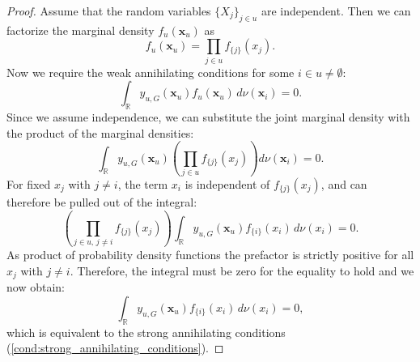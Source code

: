\begin{proof}
Assume that the random variables $\{X_j\}_{j \in u}$ are independent. Then we can factorize the marginal density $f_u(\boldsymbol{x}_u)$ as
\[
f_u(\boldsymbol{x}_u) = \prod_{j \in u} f_{\{j\}}(x_j).
\]
Now we require the weak annihilating conditions for some $i \in u \neq \emptyset$:
\[
\int_{\mathbb{R}} y_{u,G}(\boldsymbol{x}_u) f_u(\boldsymbol{x}_u) \, d \nu(\boldsymbol{x}_i) = 0.
\]
Since we assume independence, we can substitute the joint marginal density with the product of the marginal densities:
\[
\int_{\mathbb{R}} y_{u,G}(\boldsymbol{x}_u) \left( \prod_{j \in u} f_{{\{j\}}}(x_j) \right) d \nu(\boldsymbol{x}_i) = 0.
\]
For fixed $x_j$ with $j \ne i$, the term $x_i$ is independent of $f_{{\{j\}}}(x_j)$, and can therefore be pulled out of the integral:
\[
\left( \prod_{j \in u,\, j \ne i} f_{{\{j\}}}(x_j) \right) \int_{\mathbb{R}} y_{u,G}(\boldsymbol{x}_u) f_{{\{i\}}}(x_i) \, d \nu(x_i) = 0.
\]
As product of probability density functions the prefactor is strictly positive for all $x_j$ with $j \ne i$. Therefore, the integral must be zero for the equality to hold and we now obtain:
\[
\int_{\mathbb{R}} y_{u,G}(\boldsymbol{x}_u) f_{{\{i\}}}(x_i) \, d \nu(x_i) = 0,
\]
which is equivalent to the strong annihilating conditions (\autoref{cond:strong_annihilating_conditions}).
\end{proof}


